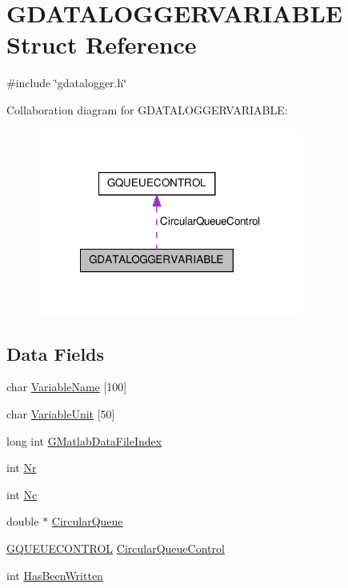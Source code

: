 \hypertarget{structGDATALOGGERVARIABLE}{\section{G\-D\-A\-T\-A\-L\-O\-G\-G\-E\-R\-V\-A\-R\-I\-A\-B\-L\-E Struct Reference}
\label{structGDATALOGGERVARIABLE}
}


{\ttfamily \#include \char`\"{}gdatalogger.\-h\char`\"{}}



Collaboration diagram for G\-D\-A\-T\-A\-L\-O\-G\-G\-E\-R\-V\-A\-R\-I\-A\-B\-L\-E\-:
\nopagebreak
\begin{figure}[H]
\begin{center}
\leavevmode
\includegraphics[width=248pt]{structGDATALOGGERVARIABLE__coll__graph}
\end{center}
\end{figure}
\subsection*{Data Fields}
\begin{DoxyCompactItemize}
\item 
char \hyperlink{structGDATALOGGERVARIABLE_a336b7b6cbfc9cdebc7e1ade3de17ac3f}{Variable\-Name} \mbox{[}100\mbox{]}
\item 
char \hyperlink{structGDATALOGGERVARIABLE_a0d42da63f3f904774cbf2ee8d92ee135}{Variable\-Unit} \mbox{[}50\mbox{]}
\item 
long int \hyperlink{structGDATALOGGERVARIABLE_aa1cd5b838d8655734e7d4499b25bf22a}{G\-Matlab\-Data\-File\-Index}
\item 
int \hyperlink{structGDATALOGGERVARIABLE_a68c3eb0f57a786afe9a2658fc42b61d6}{Nr}
\item 
int \hyperlink{structGDATALOGGERVARIABLE_abd1db7599f09e121cd125e665cb9c460}{Nc}
\item 
double $\ast$ \hyperlink{structGDATALOGGERVARIABLE_ae17ad02442f31da9518c99ce13607c8b}{Circular\-Queue}
\item 
\hyperlink{structGQUEUECONTROL}{G\-Q\-U\-E\-U\-E\-C\-O\-N\-T\-R\-O\-L} \hyperlink{structGDATALOGGERVARIABLE_a1a50747d2223f228288b4656470d9bbc}{Circular\-Queue\-Control}
\item 
int \hyperlink{structGDATALOGGERVARIABLE_ad982aef10e8496c2a1c6b9bb1f1dc5c3}{Has\-Been\-Written}
\end{DoxyCompactItemize}


